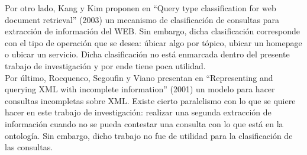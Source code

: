 Por otro lado, Kang y Kim proponen en  “Query type classification for web document retrieval” (2003)\cite{queryTypeClasWebDocumentRetrieval} un mecanismo de clasificación de consultas para extracción de información del WEB. Sin embargo, dicha clasificación corresponde con el tipo de operación que se desea: úbicar algo por tópico, ubicar un homepage o ubicar un servicio. Dicha clasificación no está enmarcada dentro del presente trabajo de investigación y por ende tiene poca utilidad. \\

Por último, Rocquenco, Segoufin y Viano presentan en “Representing and querying XML with incomplete information” (2001)\cite{repAndQueryXMLIncompInfo} un modelo para hacer consultas incompletas sobre XML. Existe cierto paralelismo con lo que se quiere hacer en este trabajo de investigación: realizar una segunda extracción de información cuando no se pueda contestar una consulta con lo que está en la ontología. Sin embargo, dicho trabajo no fue de utilidad para la clasificación de las consultas. \\